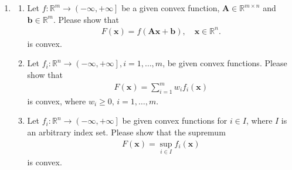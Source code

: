 \documentclass[11pt,letter,notitlepage]{article}
\begin{document}
\newpage
\begin{exercise}
    \begin{enumerate}
        
        \item
        \begin{enumerate}
            \item Let $f:\mathbb{R}^m \rightarrow \left( -\infty,+\infty \right]$ be a given convex function, $\mathbf{A}\in \mathbb{R}^{m \times n}$ and $\mathbf{b} \in \mathbb{R}^m$. Please show that
        \begin{align*}
            F(\mathbf{x}) = f(\mathbf{Ax+b}),\quad\mathbf{x}\in\mathbb{R}^n.
        \end{align*}
        is convex.
        \item Let $f_i:\mathbb{R}^n \rightarrow \left(-\infty,+\infty \right],i=1,\dots,m$, be given convex functions. Please show that
        \begin{align*}
            F(\mathbf{x}) = \sum_{i=1}^m w_if_i(\mathbf{x})
        \end{align*}
        is convex, where $w_i \geq 0,\,i=1,\dots,m$.
        
        \item
            Let $f_i:\mathbb{R}^n \rightarrow \left(-\infty,+\infty \right]$ be given convex functions for $i \in I$, where $I$ is an arbitrary index set. Please show that the supremum
            \begin{align*}
                F(\mathbf{x}) = \sup_{i\in I}f_i(\mathbf{x})
            \end{align*}
            is convex.
            
        \end{enumerate}
        

\end{enumerate}
\end{exercise}
\end{document}
